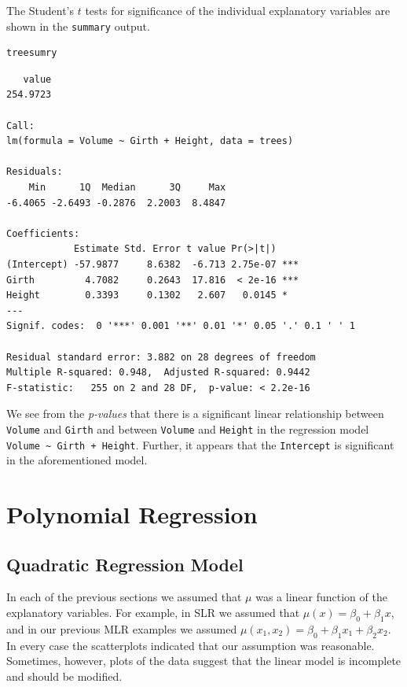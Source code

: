 \documentclass[captions=tableheading]{scrbook}
\begin{document}
The Student's \(t\) tests for significance of the individual explanatory variables are shown in the \texttt{summary} output.


\begin{verbatim}
treesumry
\end{verbatim}


\begin{verbatim}
   value 
254.9723
 
Call:
lm(formula = Volume ~ Girth + Height, data = trees)

Residuals:
    Min      1Q  Median      3Q     Max 
-6.4065 -2.6493 -0.2876  2.2003  8.4847 

Coefficients:
            Estimate Std. Error t value Pr(>|t|)    
(Intercept) -57.9877     8.6382  -6.713 2.75e-07 ***
Girth         4.7082     0.2643  17.816  < 2e-16 ***
Height        0.3393     0.1302   2.607   0.0145 *  
---
Signif. codes:  0 '***' 0.001 '**' 0.01 '*' 0.05 '.' 0.1 ' ' 1 

Residual standard error: 3.882 on 28 degrees of freedom
Multiple R-squared: 0.948,	Adjusted R-squared: 0.9442 
F-statistic:   255 on 2 and 28 DF,  p-value: < 2.2e-16
\end{verbatim}

We see from the \emph{p-values} that there is a significant linear relationship between \texttt{Volume} and \texttt{Girth} and between \texttt{Volume} and \texttt{Height} in the regression model \texttt{Volume \textasciitilde{} Girth + Height}. Further, it appears that the \texttt{Intercept} is significant in the aforementioned model.
\section{Polynomial Regression}
\label{sec-12-4}

\label{sec:Polynomial-Regression}
\subsection{Quadratic Regression Model}
\label{sec-12-4-1}


In each of the previous sections we assumed that \(\mu\) was a linear function of the explanatory variables. For example, in SLR we assumed that \(\mu(x)=\beta_{0}+\beta_{1}x\), and in our previous MLR examples we assumed \(\mu(x_{1},x_{2})=\beta_{0}+\beta_{1}x_{1}+\beta_{2}x_{2}\). In every case the scatterplots indicated that our assumption was reasonable. Sometimes, however, plots of the data suggest that the linear model is incomplete and should be modified.
\end{document}
